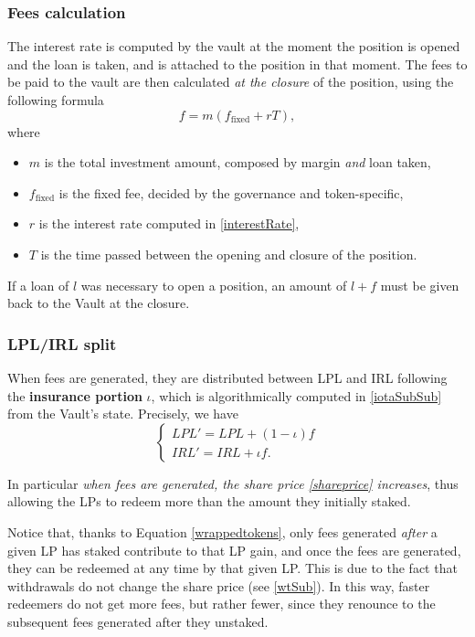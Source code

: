 \documentclass[a4paper,10 pt]{article}
\theoremstyle{definition}
\begin{document}
\subsubsection{Fees calculation}\label{dfSubSub}

The interest rate is computed by the vault at the moment the position is opened and the loan is taken, and is attached to the position in that moment. The fees to be paid to the vault are then calculated {\it at the closure} of the position, using the following formula 
\begin{equation}\label{duefees}
f = m(f_{\text{fixed}} + rT),
\end{equation}
where
\begin{itemize}
\item $m$ is the total investment amount, composed by margin {\it and} loan taken,
\item $f_{\text{fixed}}$ is the fixed fee, decided by the governance and token-specific,
\item  $r$ is the interest rate computed in \eqref{interestRate},
\item $T$ is the time passed between the opening and closure of the position.
\end{itemize}

If a loan of $l$ was necessary to open a position, an amount of $l + f$ must be given back to the Vault at the closure. 

\subsubsection{LPL/IRL split}\label{lisSubSub}

When fees are generated, they are distributed between LPL and IRL following the {\bf insurance portion} $\iota$, which is algorithmically computed in \ref{iotaSubSub} from the Vault's state. Precisely, we have
\begin{equation}\label{feesplit}
\begin{cases}
LPL' = LPL + (1-\iota)f \\
IRL' = IRL + \iota f.
\end{cases}
\end{equation}

In particular {\it when fees are generated, the share price \eqref{shareprice} increases}, thus allowing the LPs to redeem more than the amount they initially staked.

Notice that, thanks to Equation \eqref{wrappedtokens}, only fees generated {\it after} a given LP has staked contribute to that LP gain, and once the fees are generated, they can be redeemed at any time by that given LP. This is due to the fact that withdrawals do not change the share price (see \ref{wtSub}). In this way, faster redeemers do not get more fees, but rather fewer, since they renounce to the subsequent fees generated after they unstaked.
\end{document}
